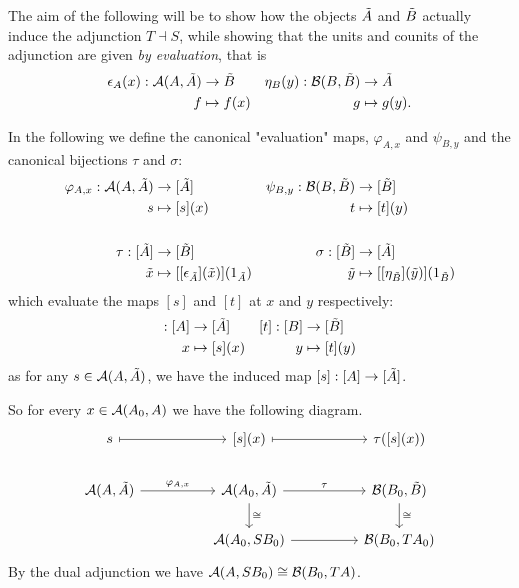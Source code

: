 \documentclass[12pt,a4paper]{article}
\def\HomA{\ensuremath\mathcal{A}}
\def\HomB{\ensuremath\mathcal{B}}
\def\t{\ensuremath\tilde}
\begin{document}
	The aim of the following will be to show how the objects $\t A$ and $\t B$ actually induce the adjunction $T \dashv S$, while showing that the units and counits of the adjunction are given \emph{by evaluation}, that is \begin{align*}
		\epsilon_A(x): \HomA(A, \t A) &\to \t B& \eta_B(y) : \HomB(B, \t 
		B) &\to \t A\\
		f & \mapsto f(x)& g &\mapsto g(y).
	\end{align*}
	
	In the following we define the canonical "evaluation" maps, $\varphi_{A, x}$ and $\psi_{B, y}$ and the canonical bijections $\tau$ and $\sigma$:  
\begin{align*}
	\varphi_{A, x} : \HomA(A, \t A) &\to [\t A ]& \psi_{B, y} : \HomB(B, \t B) &\to [\t B ]\\
	 s &\mapsto [s](x) &t &\mapsto [t](y) \\\\
	 \tau: [\t A] &\to [\t B]&\sigma: [\t B] &\to [\t A]\\
	 \t x &\mapsto  [[\epsilon_{\t A}](\t x)](1_{\t A})&\t y &\mapsto  [[\eta_{\t B}](\t y)](1_{\t B})
\end{align*}
which evaluate the maps $[s]$ and $[t]$ at $x$ and $y$ respectively:
\begin{align*}
	[s]: [A] &\to [\t A]&[t]: [B] &\to [\t B]\\
	x &\mapsto [s](x)& y &\mapsto [t](y)
\end{align*}
as for any $s \in \HomA(A, \t A) $, we have the induced map $[s]: [A] \to [\t A]$.

So for every $x \in \HomA(A_0,  A)$ we have the following diagram.
\[\begin{tikzcd}
	s && {[s](x)} && {\tau([s](x))} \\
	\HomA(A, \t A) && \HomA(A_0, \t A) && \HomB(B_0, \t B) \\
	&& \HomA(A_0, SB_0) && \HomB(B_0, TA_0)
	\arrow[maps to, from=1-1, to=1-3]
	\arrow[maps to, from=1-3, to=1-5]
	\arrow["\varphi_{A,x}", from=2-1, to=2-3]
	\arrow["\tau", from=2-3, to=2-5]
	\arrow["\cong",from=2-3, to=3-3]
	\arrow["\cong",from=2-5, to=3-5]
	\arrow[from=3-3, to=3-5]
\end{tikzcd}\]
By the dual adjunction we have $\HomA(A, SB_0) \cong \HomB(B_0, TA)$.
\end{document}

